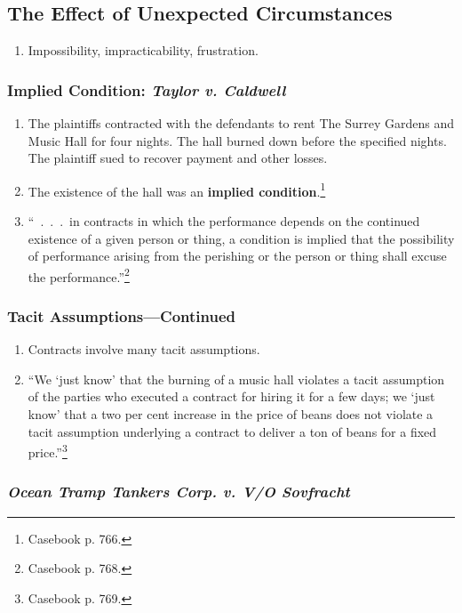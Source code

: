 \subsection{The Effect of Unexpected Circumstances}

\begin{enumerate}
    \item Impossibility, impracticability, frustration.
\end{enumerate}

\subsubsection{Implied Condition: \emph{Taylor v. Caldwell}}

\begin{enumerate}
   \item The plaintiffs contracted with the defendants to rent The Surrey 
   Gardens and Music Hall for four nights. The hall burned down before the 
   specified nights. The plaintiff sued to recover payment and other losses.
    \item The existence of the hall was an \textbf{implied 
    condition}.\footnote{Casebook p. 766.}
    \item ``~.~.~.~in contracts in which the performance depends on the 
    continued existence of a given person or thing, a condition is implied 
    that the possibility of performance arising from the perishing or the 
    person or thing shall excuse the performance.''\footnote{Casebook p.  
    768.}
\end{enumerate}

\subsubsection{Tacit Assumptions---Continued}

\begin{enumerate}
    \item Contracts involve many tacit assumptions.
    \item \enquote{We `just know' that the burning of a music hall violates a 
    tacit assumption of the parties who executed a contract for hiring it for 
    a few days; we `just know' that a two per cent increase in the price of 
    beans does not violate a tacit assumption underlying a contract to deliver 
    a ton of beans for a fixed price.}\footnote{Casebook p. 769.}
\end{enumerate}

\subsubsection{\emph{Ocean Tramp Tankers Corp. v. V/O Sovfracht}}

